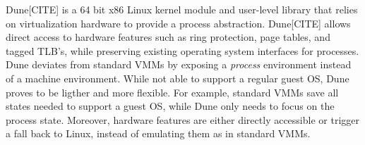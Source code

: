 Dune[CITE] is a 64 bit x86 Linux kernel module and user-level library that relies on virtualization hardware to provide a process abstraction.
Dune[CITE] allows direct access to hardware features such as ring protection, page tables, and tagged TLB's, while preserving existing operating system interfaces for processes.
Dune deviates from standard VMMs by exposing a \textit{process} environment instead of a machine environment.
While not able to support a regular guest OS, Dune proves to be ligther and more flexible.
For example, standard VMMs save all states needed to support a guest OS, while Dune only needs to focus on the process state.
Moreover, hardware features are either directly accessible or trigger a fall back to Linux, instead of emulating them as in standard VMMs.